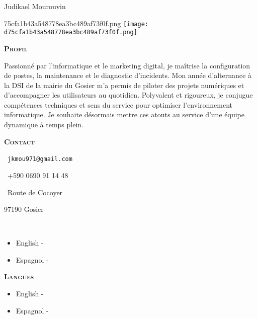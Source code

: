 \documentclass[11pt,a4paper]{article}
\newcommand{\headleft}[1]{\vspace*{3ex}\textsc{\textbf{#1}}\par%
  \vspace*{-1.5ex}\hrulefill\par\vspace*{0.7ex}}
\begin{document}
\thispagestyle{empty}
\setlength{\topskip}{0pt}\setlength{\parindent}{0pt}\setlength{\parskip}{0pt}
\raggedbottom

\begin{minipage}[t]{0.33\textwidth}
  \colorbox{cvblue}{\begin{minipage}[t][5mm][t]{\textwidth}\null\end{minipage}}
  \vspace{-.2ex}
  \colorbox{cvblue!90}{%
    \color{white}\textwidth
    \begin{minipage}[t][293mm][t]{0.82\textwidth}\raggedright
      \vspace*{2.5ex}
      \Large Judikael Mourouvin\normalsize

      \ifx\relaxd75cfa1b43a548778ea3bc489af73f0f.png\relax\else
        \vspace{2ex}\null\hfill
        \texttt{[image: d75cfa1b43a548778ea3bc489af73f0f.png]}
        \hfill\null
      \fi

      \headleft{Profil}
      \begingroup           %
       \justifying         %
        Passionné par l’informatique et le marketing digital, je maîtrise la configuration de postes, la maintenance et le diagnostic d’incidents. Mon année d’alternance à la DSI de la mairie du Gosier m’a permis de piloter des projets numériques et d’accompagner les utilisateurs au quotidien. Polyvalent et rigoureux, je conjugue compétences techniques et sens du service pour optimiser l’environnement informatique. Je souhaite désormais mettre ces atouts au service d’une équipe dynamique à temps plein.
      \endgroup             %

      \headleft{Contact}\small
      \MVAt\  \texttt{jkmou971@gmail.com}\par
      \Mobilefone\ +590 0690 91 14 48\par
      \Letter\ Route de Cocoyer\par
      97190 Gosier\par
      \faLinkedin\  \href{}{}
      \normalsize

      \ifx\relax\begin{itemize}[leftmargin=*]
\item English - \textcolor{gray}{}
\item Espagnol - \textcolor{gray}{}\end{itemize}\relax\else
        \headleft{Langues}
        \begin{itemize}[leftmargin=*]
\item English - \textcolor{gray}{}
\item Espagnol - \textcolor{gray}{}\end{itemize}
      \fi


\end{minipage}}
\end{minipage}
\end{document}
